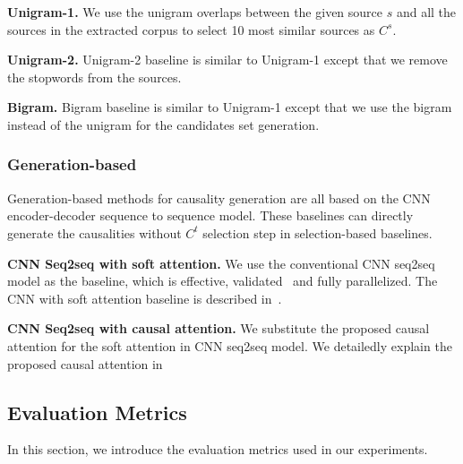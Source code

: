 \textbf{Unigram-1.}
We use the unigram overlaps between the given source $s$ and all the sources in the extracted corpus to select 10 most similar sources as $C^s$.

\textbf{Unigram-2.}
Unigram-2 baseline is similar to Unigram-1 except that
we remove the stopwords from the sources.

\textbf{Bigram.}
Bigram baseline is similar to Unigram-1 except that
we use the bigram instead of the unigram for the
candidates set generation.

\subsubsection{Generation-based}
Generation-based methods for causality generation
are all based on the CNN encoder-decoder sequence to sequence model. These baselines can directly generate
the causalities without $C^t$ selection step in
selection-based baselines.

\textbf{CNN Seq2seq with soft attention.}
We use the conventional CNN seq2seq model as the
baseline, which is effective,  validated~\cite{DBLP:conf/emnlp/EdunovOAG18,DBLP:conf/coling/SongTHLQL18,DBLP:journals/corr/abs-1809-10853, DBLP:conf/acl/LewisDF18} and fully parallelized.
The CNN with soft attention baseline is described in~.

\textbf{CNN Seq2seq with causal attention.}
We substitute the proposed causal attention for the soft attention in CNN seq2seq model.
We detailedly explain the proposed causal attention in ~ 




\subsection{Evaluation Metrics}
\label{sec:metrics}
In this section, we introduce the evaluation metrics used in 
our experiments.

